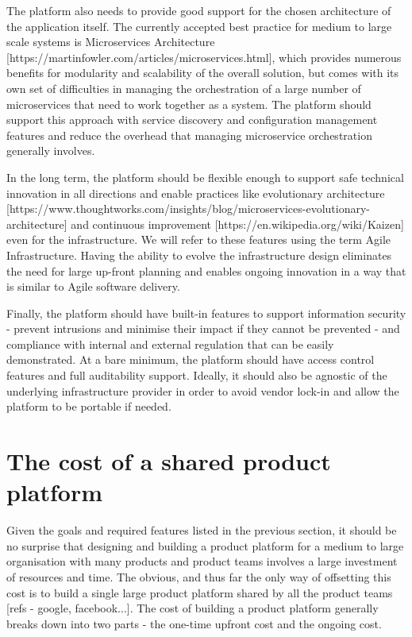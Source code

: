 \documentclass[reprint,amsmath,amssymb,aps]{revtex4-1}
\begin{document}
The platform also needs to provide good support for the chosen architecture of the application itself. The currently accepted best practice for medium to large scale systems is Microservices Architecture [https://martinfowler.com/articles/microservices.html], which provides numerous benefits for modularity and scalability of the overall solution, but comes with its own set of difficulties in managing the orchestration of a large number of microservices that need to work together as a system. The platform should support this approach with service discovery and configuration management features and reduce the overhead that managing microservice orchestration generally involves.

In the long term, the platform should be flexible enough to support safe technical innovation in all directions and enable practices like evolutionary architecture [https://www.thoughtworks.com/insights/blog/microservices-evolutionary-architecture] and continuous improvement [https://en.wikipedia.org/wiki/Kaizen] even for the infrastructure. We will refer to these features using the term Agile Infrastructure. Having the ability to evolve the infrastructure design eliminates the need for large up-front planning and enables ongoing innovation in a way that is similar to Agile software delivery.

Finally, the platform should have built-in features to support information security - prevent intrusions and minimise their impact if they cannot be prevented - and compliance with internal and external regulation that can be easily demonstrated. At a bare minimum, the platform should have access control features and full auditability support. Ideally, it should also be agnostic of the underlying infrastructure provider in order to avoid vendor lock-in and allow the platform to be portable if needed.


\section{\label{sec:cost}The cost of a shared product platform}

Given the goals and required features listed in the previous section, it should be no surprise that designing and building a product platform for a medium to large organisation with many products and product teams involves a large investment of resources and time. The obvious, and thus far the only way of offsetting this cost is to build a single large product platform shared by all the product teams [refs - google, facebook...]. The cost of building a product platform generally breaks down into two parts - the one-time upfront cost and the ongoing cost.
\end{document}
